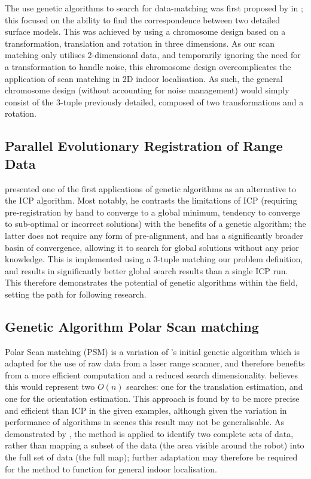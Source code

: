\documentclass[authoryearcitations]{UoYCSproject}
\begin{document}
The use genetic algorithms to search for data-matching was first proposed by \citet{Brunnstrom1996-vo} in \citeyear{Brunnstrom1996-vo}; this focused on the ability to find the correspondence between two detailed surface models. This was achieved by using a chromosome design based on a transformation, translation and rotation in three dimensions. As our scan matching only utilises 2-dimensional data, and temporarily ignoring the need for a transformation to handle noise, this chromosome design overcomplicates the application of scan matching in 2D indoor localisation. As such, the general chromosome design (without accounting for noise management) would simply consist of the 3-tuple previously detailed, composed of two transformations and a rotation.

\subsection{Parallel Evolutionary Registration of Range Data}
\citet{Robertson2002-ou} presented one of the first applications of genetic algorithms as an alternative to the ICP algorithm. Most notably, he contrasts the limitations of ICP (requiring pre-registration by hand to converge to a global minimum, tendency to converge to sub-optimal or incorrect solutions) with the benefits of a genetic algorithm; the latter does not require any form of pre-alignment, and has a significantly broader basin of convergence, allowing it to search for global solutions without any prior knowledge. This is implemented using a 3-tuple matching our problem definition, and results in significantly better global search results than a single ICP run. This therefore demonstrates the potential of genetic algorithms within the field, setting the path for following research.

\subsection{Genetic Algorithm Polar Scan matching}
Polar Scan matching (PSM) is a variation of \citeauthor{Robertson2002-ou}'s initial genetic algorithm which is adapted for the use of raw data from a laser range scanner, and therefore benefits from a more efficient computation and a reduced search dimensionality. \citet{Ze-Su2007-li} believes this would represent two $O(n)$ searches: one for the translation estimation, and one for the orientation estimation. This approach is found by \citeauthor{Ze-Su2007-li} to be more precise and efficient than ICP in the given examples, although given the variation in performance of algorithms in scenes \cite{Donoso2017-wp} this result may not be generalisable. As demonstrated by \citeauthor{Ze-Su2007-li}, the method is applied to identify two complete sets of data, rather than mapping a subset of the data (the area visible around the robot) into the full set of data (the full map); further adaptation may therefore be required for the method to function for general indoor localisation.
\end{document}
